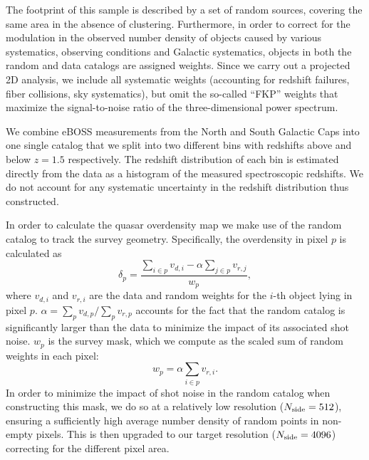 \documentclass[a4paper,11pt]{article}
\begin{document}
      The footprint of this sample is described by a set of random sources, covering the same area in the absence of clustering. Furthermore, in order to correct for the modulation in the observed number density of objects caused by various systematics, observing conditions and Galactic systematics, objects in both the random and data catalogs are assigned weights. Since we carry out a projected 2D analysis, we include all systematic weights (accounting for redshift failures, fiber collisions, sky systematics), but omit the so-called ``FKP'' weights that maximize the signal-to-noise ratio of the three-dimensional power spectrum.

      We combine eBOSS measurements from the North and South Galactic Caps into one single catalog that we split into two different bins with redshifts above and below $z=1.5$ respectively. The redshift distribution of each bin is estimated directly from the data as a histogram of the measured spectroscopic redshifts. We do not account for any systematic uncertainty in the redshift distribution thus constructed.

      In order to calculate the quasar overdensity map we make use of the random catalog to track the survey geometry. Specifically, the overdensity in pixel $p$ is calculated as
      \begin{equation}\label{eq:eboss.signal}
        \delta_p = \frac{\sum_{i \in p} v_{d,i} - \alpha \sum_{j \in p}v_{r,j}}{w_p},
      \end{equation}
      where $v_{d,i}$ and $v_{r,i}$ are the data and random weights for the $i$-th object lying in pixel $p$. $\alpha = \sum_p v_{d, p} / \sum_p v_{r, p}$ accounts for the fact that the random catalog is significantly larger than the data to minimize the impact of its associated shot noise. $w_p$ is the survey mask, which we compute as the scaled sum of random weights in each pixel:
      \begin{equation}
        w_p = \alpha \sum_{i \in p} v_{r, i}.
      \end{equation}
      In order to minimize the impact of shot noise in the random catalog when constructing this mask, we do so at a relatively low resolution ($N_{\rm side}=512$), ensuring a sufficiently high average number density of random points in non-empty pixels. This is then upgraded to our target resolution ($N_{\rm side}=4096$) correcting for the different pixel area. 
\end{document}
